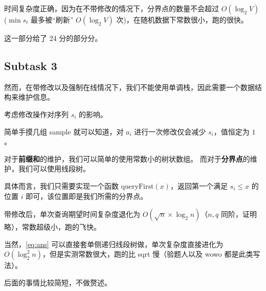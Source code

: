 \documentclass[14pt,a4paper]{article}
\begin{document}
时间复杂度正确，因为在不带修改的情况下，分界点的数量不会超过 $O(\log_2 V)$ ($\min s_t$ 最多被“刷新” $O(\log_2 V)$ 次)，在随机数据下常数很小，跑的很快。

这一部分给了 24 分的部分分。

\subsection{Subtask 3}
然而，在带修改以及强制在线情况下，我们不能使用单调栈，因此需要一个数据结构来维护信息。

考虑修改操作对序列 $s_i$ 的影响。

简单手摸几组 sample 就可以知道，对 $a_i$ 进行一次修改仅会减少 $s_i$，值恒定为 $1$。

对于\textbf{前缀和}的维护，我们可以简单的使用常数小的树状数组。
而对于\textbf{分界点}的维护，我们可以使用线段树。

具体而言，我们只需要实现一个函数 $\text{queryFirst}(x) $，返回第一个满足 $s_i \le x$ 的位置 $i$ 即可，该位置即是我们所需的分界点。

带修改后，单次查询期望时间复杂度退化为 $O(\sqrt{n} \times \log_2 n)$（$n,q$ 同阶，证明略），常数超级小，跑的飞快。

当然，\eqref{eq:ans} 可以直接套单侧递归线段树做，单次复杂度直接进化为 $O(\log_2^2 n)$，但是实测常数很大，跑的比 sqrt 慢（验题人以及 wowo 都是此类写法）。

后面的事情比较简短，不做赘述。
\end{document}
